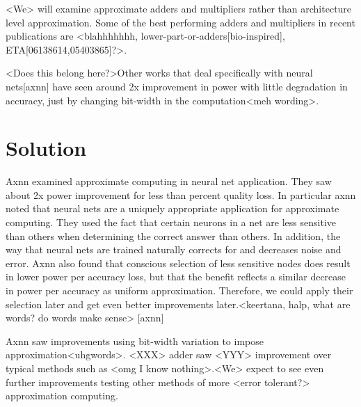 \documentclass[conference]{IEEEtran}
\begin{document}
<We> will examine approximate adders and multipliers rather than architecture level approximation. Some of the best performing adders and multipliers in recent publications are <blahhhhhhh, lower-part-or-adders[bio-inspired], ETA[06138614,05403865]?>. 

<Does this belong here?>Other works that deal specifically with neural nets[axnn] have seen around 2x improvement in power with little degradation in accuracy, just by changing bit-width in the computation<meh wording>. 

\section{Solution}


Axnn examined approximate computing in neural net application. They saw about 2x power improvement for less than percent quality loss. In particular axnn noted that neural nets are a uniquely appropriate application for approximate computing. They used the fact that certain neurons in a net are less sensitive than others when determining the correct answer than others. In addition, the way that neural nets are trained naturally corrects for and decreases noise and error. Axnn also found that conscious selection of less sensitive nodes does result in lower power per accuracy loss, but that the benefit reflects a similar decrease in power per accuracy as uniform approximation. Therefore, we could apply their selection later and get even better improvements later.<keertana, halp, what are words? do words make sense> [axnn] 

Axnn saw improvements using bit-width variation to impose approximation<uhgwords>. <XXX> adder saw <YYY> improvement over typical methods such as <omg I know nothing>.<We> expect to see even further improvements testing other methods of more <error tolerant?> approximation computing.
\end{document}
